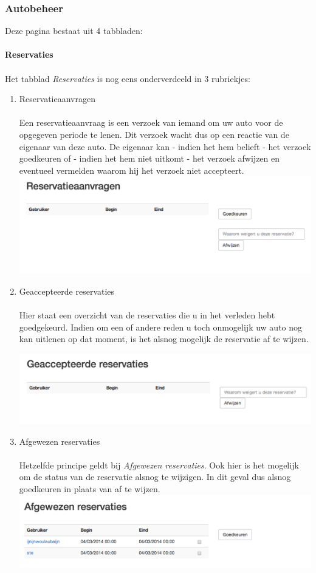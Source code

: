 \documentclass[11pt,a4paper,oneside]{article}
\begin{document}
\subsubsection{Autobeheer}
\label{autobeheer}
Deze pagina bestaat uit 4 tabbladen: \\\\
{\large{\textbf{Reservaties}}} \\\\
Het tabblad \textit{Reservaties} is nog eens onderverdeeld in 3 rubriekjes: \\
\begin{enumerate}
\item Reservatieaanvragen \\\\
Een reservatieaanvraag is  een verzoek van iemand om uw auto voor de opgegeven periode te lenen. Dit verzoek wacht dus op een reactie van de eigenaar van deze auto.
De eigenaar kan - indien het hem belieft - het verzoek goedkeuren of - indien het hem niet uitkomt - het verzoek afwijzen en eventueel vermelden waarom hij het verzoek niet accepteert.
\includegraphics[scale=0.75]{img/reservatieaanvragen}
\item Geaccepteerde reservaties \\\\
Hier staat een overzicht van de reservaties die u in het verleden hebt goedgekeurd. Indien om een of andere reden u toch onmogelijk uw auto nog kan uitlenen op dat moment, is het alsnog mogelijk de reservatie af te wijzen.
\begin{center}
\includegraphics[scale=0.75]{img/geaccepteerd}
\end{center}
\item Afgewezen reservaties \\\\
Hetzelfde principe geldt bij \textit{Afgewezen reservaties}. Ook hier is het mogelijk om de status van de reservatie alsnog te wijzigen. In dit geval dus alsnog goedkeuren in plaats van af te wijzen.
\includegraphics[scale=0.75]{img/afgewezen}
\end{enumerate}
\end{document}
